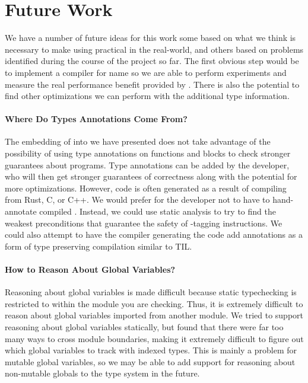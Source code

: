 \section{Future Work}
We have a number of future ideas for this work some based on what we think is necessary to make using \name practical in the real-world, and others based on problems identified during the course of the project so far.
The first obvious step would be to implement a compiler for name so we are able to perform experiments and measure the real performance benefit provided by \name.
There is also the potential to find other optimizations we can perform with the additional type information.

\paragraph{Where Do Types Annotations Come From?}
The embedding of \wasm into \name we have presented does not take advantage of the possibility of using type annotations on functions and blocks to check stronger guarantees about programs.
Type annotations can be added by the developer, who will then get stronger guarantees of correctness along with the potential for more optimizations.
However, \wasm code is often generated as a result of compiling from Rust, C, or C++.
We would prefer for the developer not to have to hand-annotate compiled \wasm.
Instead, we could use static analysis to try to find the weakest preconditions that guarantee the safety of \prechk-tagging instructions.
We could also attempt to have the compiler generating the \wasm code add annotations as a form of type preserving compilation similar to TIL.

\paragraph{How to Reason About Global Variables?}
Reasoning about global variables is made difficult because static typechecking is restricted to within the module you are checking.
Thus, it is extremely difficult to reason about global variables imported from another module.
We tried to support reasoning about global variables statically, but found that there were far too many ways to cross module boundaries, making it extremely difficult to figure out which global variables to track with indexed types.
This is mainly a problem for mutable global variables, so we may be able to add support for reasoning about non-mutable globals to the type system in the future.

